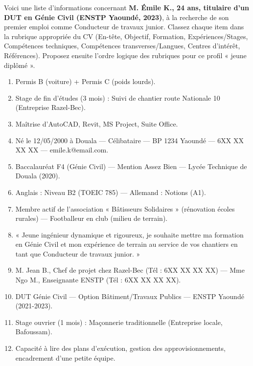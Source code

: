 \documentclass[11pt]{article}
\newcounter{popsec}
\newcounter{popsub}
\newcommand{\courssub}[1]{%
  \stepcounter{popsub}%
  \par\vspace{9pt}\noindent{\popxbold\fontsize{11.5}{13}\selectfont\color{popink}{\color{poporange}\thepopsec.\thepopsub}\hspace{6pt}#1}\par\nopagebreak\vspace{4pt}
}
\begin{document}
\courssub{Je m'entraîne}

\begin{exercice}
Voici une liste d'informations concernant \textbf{M. Émile K., 24 ans, titulaire d'un DUT en Génie Civil (ENSTP Yaoundé, 2023)}, à la recherche de son premier emploi comme Conducteur de travaux junior.
Classez chaque item dans la rubrique appropriée du CV (En-tête, Objectif, Formation, Expériences/Stages, Compétences techniques, Compétences transverses/Langues, Centres d'intérêt, Références). Proposez ensuite l'ordre logique des rubriques pour ce profil « jeune diplômé ».
\begin{enumerate}
\item Permis B (voiture) + Permis C (poids lourds).
\item Stage de fin d'études (3 mois) : Suivi de chantier route Nationale 10 (Entreprise Razel-Bec).
\item Maîtrise d'AutoCAD, Revit, MS Project, Suite Office.
\item Né le 12/05/2000 à Douala — Célibataire — BP 1234 Yaoundé — 6XX XX XX XX — emile.k@email.com.
\item Baccalauréat F4 (Génie Civil) — Mention Assez Bien — Lycée Technique de Douala (2020).
\item Anglais : Niveau B2 (TOEIC 785) — Allemand : Notions (A1).
\item Membre actif de l'association « Bâtisseurs Solidaires » (rénovation écoles rurales) — Footballeur en club (milieu de terrain).
\item « Jeune ingénieur dynamique et rigoureux, je souhaite mettre ma formation en Génie Civil et mon expérience de terrain au service de vos chantiers en tant que Conducteur de travaux junior. »
\item M. Jean B., Chef de projet chez Razel-Bec (Tél : 6XX XX XX XX) — Mme Ngo M., Enseignante ENSTP (Tél : 6XX XX XX XX).
\item DUT Génie Civil — Option Bâtiment/Travaux Publics — ENSTP Yaoundé (2021-2023).
\item Stage ouvrier (1 mois) : Maçonnerie traditionnelle (Entreprise locale, Bafoussam).
\item Capacité à lire des plans d'exécution, gestion des approvisionnements, encadrement d'une petite équipe.
\end{enumerate}
\end{exercice}
\end{document}
